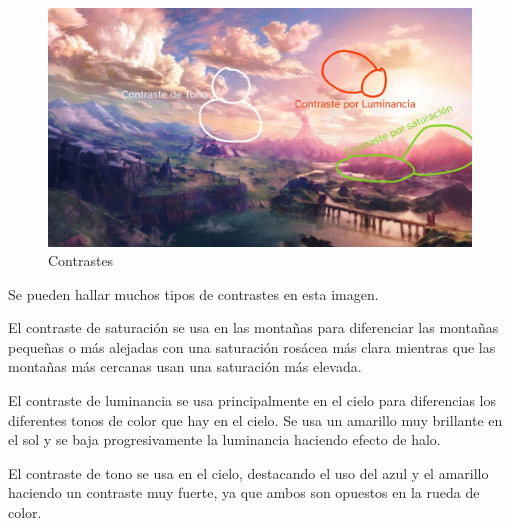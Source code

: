 \documentclass[12pt]{article}
\begin{document}
          \newpage

          \begin{figure}[H]
            \centering
            \includegraphics[scale = 0.2]{Jesus/Seccion2/contrastes.jpg}
            \caption{Contrastes}
          \end{figure}

          Se pueden hallar muchos tipos de contrastes en esta imagen. 

          El contraste de saturación se usa en las montañas para diferenciar las montañas pequeñas o más alejadas con una saturación rosácea más clara mientras que las montañas más cercanas usan una saturación más elevada. 

          El contraste de luminancia se usa principalmente en el cielo para diferencias los diferentes tonos de color que hay en el cielo. Se usa un amarillo muy brillante en el sol y se baja progresivamente la luminancia haciendo efecto de halo. 

          El contraste de tono se usa en el cielo, destacando el uso del azul y el amarillo haciendo un contraste muy fuerte, ya que ambos son opuestos en la rueda de color. 

          \newpage

\end{document}
